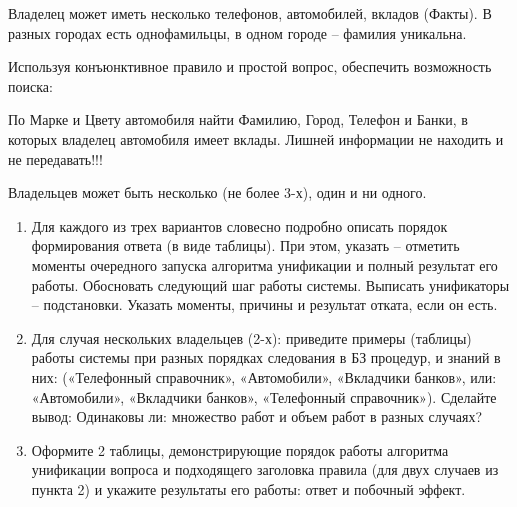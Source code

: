 \documentclass[12pt]{report}
\begin{document}
Владелец может иметь несколько телефонов, автомобилей, вкладов (Факты). В разных городах есть однофамильцы, в одном городе – фамилия уникальна.

Используя конъюнктивное правило и простой вопрос, обеспечить возможность поиска:

По Марке и Цвету автомобиля найти Фамилию, Город, Телефон и Банки, в которых владелец автомобиля имеет вклады. Лишней информации не находить и не передавать!!!

Владельцев может быть несколько (не более 3-х), один и ни одного.

\begin{enumerate}
	\item Для каждого из трех вариантов словесно подробно описать порядок формирования ответа (в виде таблицы). При этом, указать – отметить моменты очередного запуска алгоритма унификации и полный результат его работы. Обосновать следующий шаг работы системы. Выписать унификаторы – подстановки. Указать моменты, причины и результат отката, если он есть.
	\item Для случая нескольких владельцев (2-х): 
	приведите примеры (таблицы) работы системы при разных порядках следования в БЗ  процедур, и знаний в них: («Телефонный справочник», «Автомобили», «Вкладчики банков», или: «Автомобили», «Вкладчики банков», «Телефонный справочник»). Сделайте вывод: Одинаковы ли: множество работ и объем работ в разных случаях?
	\item Оформите 2 таблицы, демонстрирующие порядок работы алгоритма унификации вопроса и подходящего заголовка правила (для двух случаев из пункта 2) и укажите результаты его работы: ответ и побочный эффект.
\end{enumerate}
\end{document}
